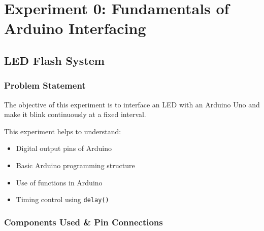 \chapter{Experiment 0: Fundamentals of Arduino Interfacing}

\section{LED Flash System}

\subsection{Problem Statement}

The objective of this experiment is to interface an LED with an Arduino Uno and make it blink continuously at a fixed interval.

This experiment helps to understand:

\begin{itemize}
    \item Digital output pins of Arduino
    \item Basic Arduino programming structure
    \item Use of functions in Arduino
    \item Timing control using \texttt{delay()}
\end{itemize}


\subsection {Components Used \& Pin Connections}


